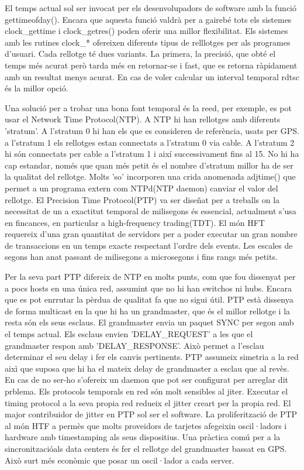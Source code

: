 \documentclass[a4paper, 10pt]{article}
\begin{document}
El temps actual sol ser invocat per els desenvolupadors de software amb la funció gettimeofday(). Encara que aquesta funció valdrà per a gairebé tots els sistemes clock\_gettime i
clock\_getres() poden oferir una millor flexibilitat. Els sistemes amb les rutines clock\_* ofereixen diferents tipus de relllotges per als programes d'usuari. Cada rellotge té dues 
variants. La primera, la precisió,  que obté el temps més acurat però tarda més en retornar-se i fast, que es retorna ràpidament amb un resultat menys acurat. En cas de voler 
calcular un interval temporal rdtsc és la millor opció.


Una solució per a trobar una bona font temporal és la reed, per exemple, es pot usar el Network Time Protocol(NTP). A NTP hi han rellotges amb diferents 'stratum'. A l'stratum 0 hi han
els que es consideren de referència, usats per GPS. a l'stratum 1 els rellotges estan connectats a l'stratum 0 via cable. A l'stratum 2 hi són connectats per cable a l'stratum 1 i així successivament fins al 15.
No hi ha cap estandar, només que quan més petit és el nombre d'stratum millor ha de ser la qualitat del rellotge.
Molts 'so' incorporen una crida anomenada adjtime() que permet a un programa extern com NTPd(NTP daemon) canviar el valor del rellotge. 
El Precision Time Protocol(PTP) va ser diseñat per a treballs on la necessitat de un a exactitut temporal de milisegons és essencial, actualment s'usa en fincances, en particular  a high-frequency trading(TDT).
El món HFT requereix d'una gran quantitat de servidors per a poder executar un gran nombre de transaccions en un temps exacte respectant l'ordre dels events. Les escales de segons han anat passant
de milisegons a microsegons i fins rangs més petits.


Per la seva part PTP difereix de NTP en molts punts, com que fou dissenyat per a pocs hosts en una única red, assumint que no hi han switchos ni hubs. Encara que es pot enrrutar la pèrdua de 
qualitat fa que no sigui útil. PTP està dissenya de forma multicast en la que hi ha un grandmaster, que és el millor rellotge i la resta són els seus esclaus. El grandmaster envia un paquet SYNC per segon amb el temps actual.
Els esclaus envien 'DELAY\_REQUEST' a les que el grandmaster respon amb 'DELAY\_RESPONSE'. Això permet a l'esclau determinar el seu delay i fer els canvis pertinents.
PTP assumeix simetria a la red aixì que suposa que hi ha el mateix delay de grandmaster a esclau que al revès. En cas de no ser-ho s'ofereix un daemon que pot ser configurat per arreglar dit prblema.
Els protocols temporals en red són molt sensibles al jiter. Executar el timing protocol a la seva propia red redueix el jitter creart per la propia red. El major contribuidor de jitter en PTP sol
ser el software. La proliferització de PTP al món HTF a permès que molts proveidors de tarjetes afegeixin oscil·ladors i hardware amb timestamping als seus dispositius.
Una pràctica comú per a la sincronitzacióals data centers és fer el rellotge del grandmaster bassat en GPS. Això surt més econòmic que posar un oscil·lador a cada server.
\end{document}
